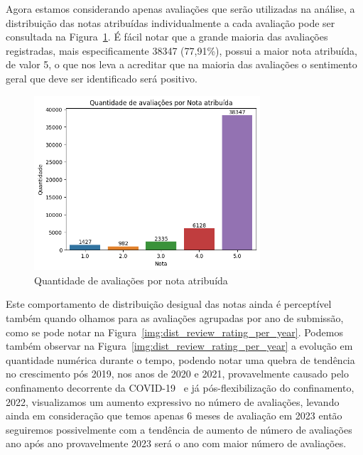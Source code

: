 Agora estamos considerando apenas avaliações que serão utilizadas na análise, a distribuição das notas atribuídas individualmente a cada avaliação pode ser consultada na Figura~\ref{img:dist_review_rating}. É fácil notar que a grande maioria das avaliações registradas, mais especificamente 38347 (77,91\%), possui a maior nota atribuída, de valor 5, o que nos leva a acreditar que na maioria das avaliações o sentimento geral que deve ser identificado será positivo.

\begin{figure}
	\centering
	\includegraphics[width=0.75\textwidth]{figs/exploratoria/quantidade_avaliacao_nota_atribuida.png}
	\caption{Quantidade de avaliações por nota atribuída}
	\label{img:dist_review_rating}
\end{figure}

Este comportamento de distribuição desigual das notas ainda é perceptível também quando olhamos para as avaliações agrupadas por ano de submissão, como se pode notar na Figura~\ref{img:dist_review_rating_per_year}. Podemos também observar na Figura~\ref{img:dist_review_rating_per_year} a evolução em quantidade numérica durante o tempo, podendo notar uma quebra de tendência no crescimento pós 2019, nos anos de 2020 e 2021, provavelmente causado pelo confinamento decorrente da COVID-19~\cite{Guardia2022} e já pós-flexibilização do confinamento, 2022, visualizamos um aumento expressivo no número de avaliações, levando ainda em consideração que temos apenas 6 meses de avaliação em 2023 então seguiremos possivelmente com a tendência de aumento de número de avaliações ano após ano provavelmente 2023 será o ano com maior número de avaliações.

